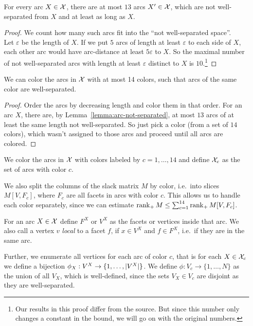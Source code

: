 \begin{lemma}\label{lemma:arc-not-separated}
  For every arc $X \in \mathcal{X}$, there are at most $13$ arcs $X' \in \mathcal{X}$, which are not well-separated from $X$ and at least as long as $X$.
\end{lemma}

\begin{proof}
  We count how many such arcs fit into the ``not well-separated space''.\\
  Let $\varepsilon$ be the length of $X$. If we put $5$ arcs of length at least $\varepsilon$ to each side of $X$, each other arc would have arc-distance at least $5 \varepsilon$ to $X$. So the maximal number of not well-separated arcs with length at least $\varepsilon$ distinct to $X$ is $10$.\footnote{Our results in this proof differ from the source. But since this number only changes a constant in the bound, we will go on with the original numbers.}
\end{proof}

\begin{lemma}
  We can color the arcs in $\mathcal{X}$ with at most 14 colors, such that arcs of the same color are well-separated.
\end{lemma}

\begin{proof}
  Order the arcs by decreasing length and color them in that order. For an arc $X$, there are, by Lemma~\ref{lemma:arc-not-separated}, at most $13$ arcs of at least the same length not well-separated. So just pick a color (from a set of $14$ colors), which wasn't assigned to those arcs and proceed until all arcs are colored.
\end{proof}

We color the arcs in $\mathcal{X}$ with colors labeled by $c=1,\dots,14$ and define $\mathcal{X}_c$ as the set of arcs with color $c$.

We also split the columns of the slack matrix $M$ by color, i.e.\ into slices $M[V,F_c]$, where $F_c$ are all facets in arcs with color $c$.
This allows us to handle each color separately, since we can estimate $\operatorname{rank}_+ M \leq \sum_{c=1}^{14} \operatorname{rank}_+ M[V,F_c]$.

For an arc $X \in \mathcal{X}$ define $F^X$ or $V^X$ as the facets or vertices inside that arc. We also call a vertex $v$ \emph{local} to a facet $f$, if $x \in V^X$ and $f \in F^X$, i.e.\ if they are in the same arc.

Further, we enumerate all vertices for each arc of color $c$, that is for each $X \in \mathcal{X}_c$ we define a bijection $\phi_X: V^X \to \{1,\dots,\lvert V^X\rvert\}$. We define $\phi: V_c \to \{1,\dots,N\}$ as the union of all $V_X$, which is well-defined, since the sets $V_X \in V_c$ are disjoint as they are well-separated.

